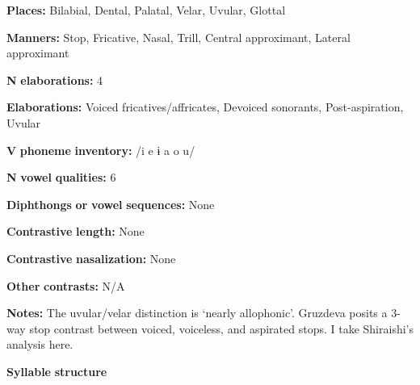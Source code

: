 \begin{styleBody}
\textbf{Places:} Bilabial, Dental, Palatal, Velar, Uvular, Glottal
\end{styleBody}

\begin{styleBody}
\textbf{Manners:} Stop, Fricative, Nasal, Trill, Central approximant, Lateral approximant
\end{styleBody}

\begin{styleBody}
\textbf{N} \textbf{elaborations:} 4
\end{styleBody}

\begin{styleBody}
\textbf{Elaborations:} Voiced fricatives/affricates, Devoiced sonorants, Post-aspiration, Uvular
\end{styleBody}

\begin{styleBody}
\textbf{V} \textbf{phoneme} \textbf{inventory:} /i e ɨ a o u/
\end{styleBody}

\begin{styleBody}
\textbf{N} \textbf{vowel} \textbf{qualities:} 6
\end{styleBody}

\begin{styleBody}
\textbf{Diphthongs} \textbf{or} \textbf{vowel} \textbf{sequences:} None
\end{styleBody}

\begin{styleBody}
\textbf{Contrastive} \textbf{length:} None
\end{styleBody}

\begin{styleBody}
\textbf{Contrastive} \textbf{nasalization:} None
\end{styleBody}

\begin{styleBody}
\textbf{Other} \textbf{contrasts:} N/A
\end{styleBody}

\begin{styleBody}
\textbf{Notes:} The uvular/velar distinction is ‘nearly allophonic’. Gruzdeva posits a 3-way stop contrast between voiced, voiceless, and aspirated stops. I take Shiraishi’s analysis here.
\end{styleBody}

\begin{styleBody}
\textbf{Syllable} \textbf{structure}
\end{styleBody}

